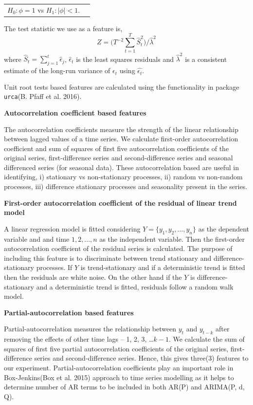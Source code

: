\documentclass[11pt,]{article}
\theoremstyle{definition}
\theoremstyle{definition}
\theoremstyle{definition}
\theoremstyle{remark}
\begin{document}
\begin{table}[!h]
\centering
\begin{tabular}{rl}
$H_0: \phi = 1$ vs
$H_1: |\phi| < 1$. 
\end{tabular}
\end{table}

The test statistic we use as a feature is,
\[Z=\big( T^{-2}\sum_{t=1}^{T}\hat{S}_t^2\big)/\hat{\lambda}^2\] where
\(\hat{S}_t=\sum_{j=1}^t\hat{\epsilon}_j\), \(\hat{\epsilon}_t\) is the
least squares residuals and \(\hat{\lambda}^2\) is a consistent estimate
of the long-run variance of \(\epsilon_t\) using \(\hat{\epsilon_t}\).

Unit root tests based features are calculated using the functionality in
package \texttt{urca}(B. Pfaff et al. 2016).

\textbf{Autocorrelation coefficient based features}

The autocorrelation coefficients measure the strength of the linear
relationship between lagged values of a time series. We calculate
first-order autocorrelation coefficient and sum of squares of first five
autocorrelation coefficients of the original series, first-difference
series and second-difference series and seasonal differenced series (for
seasonal data). These autocorrelation based are useful in identifying,
i) stationary vs non-stationary processes, ii) random vs non-random
processes, iii) difference stationary processes and seasonality present
in the series.

\textbf{First-order autocorrelation coefficient of the residual of
linear trend model}

A linear regression model is fitted considering
\(Y = \{y_1, y_2, ..., y_n\}\) as the dependent variable and and time
\(1, 2,..., n\) as the independent variable. Then the first-order
autocorrelation coefficient of the residual series is calculated. The
purpose of including this feature is to discriminate between trend
stationary and difference-stationary processes. If \(Y\) is
trend-stationary and if a deterministic trend is fitted then the
residuals are white noise. On the other hand if the \(Y\) is
difference-stationary and a deterministic trend is fitted, residuals
follow a random walk model.

\textbf{Partial-autocorrelation based features}

Partial-autocorrelation measures the relationship between \(y_t\) and
\(y_{t-k}\) after removing the effects of other time lags -- 1, 2, 3,
\ldots{}\(k-1\). We calculate the sum of squares of first five partial
autocorrelation coefficients of the original series, first-difference
series and second-difference series. Hence, this gives three(3) features
to our experiment. Partial-autocorrelation coefficients play an
important role in Box-Jenkins(Box et al. 2015) approach to time series
modelling as it helps to determine number of AR terms to be included in
both AR(P) and ARIMA(P, d, Q).
\end{document}
